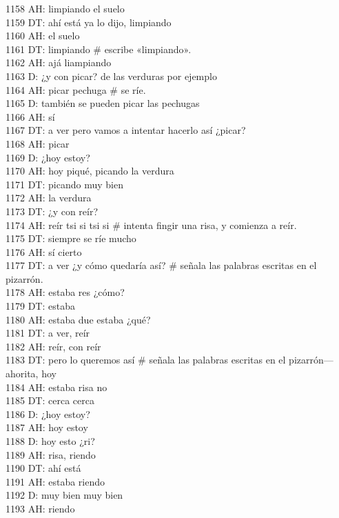1158 AH: limpiando el suelo\\
1159 DT: ahí está ya lo dijo, limpiando\\
1160 AH: el suelo\\
1161 DT: limpiando \# escribe «limpiando».\\
1162 AH: ajá liampiando\\
1163 D: ¿y con picar? de las verduras por ejemplo\\
1164 AH: picar pechuga \# se ríe.\\
1165 D: también se pueden picar las pechugas\\
1166 AH: sí\\
1167 DT: a ver pero vamos a intentar hacerlo así ¿picar?\\
1168 AH: picar\\
1169 D: ¿hoy estoy?\\
1170 AH: hoy piqué, picando la verdura\\
1171 DT: picando muy bien\\
1172 AH: la verdura\\
1173 DT: ¿y con reír?\\
1174 AH: reír tsi si tsi si \# intenta fingir una risa, y comienza a reír.\\
1175 DT: siempre se ríe mucho\\
1176 AH: sí cierto\\
1177 DT: a ver ¿y cómo quedaría así? \# señala las palabras escritas en el pizarrón.\\
1178 AH: estaba res ¿cómo?\\
1179 DT: estaba\\
1180 AH: estaba due estaba ¿qué?\\
1181 DT: a ver, reír\\
1182 AH: reír, con reír\\
1183 DT: pero lo queremos así \# señala las palabras escritas en el pizarrón--- ahorita, hoy\\
1184 AH: estaba risa no\\
1185 DT: cerca cerca\\
1186 D: ¿hoy estoy?\\
1187 AH: hoy estoy\\
1188 D: hoy esto ¿ri?\\
1189 AH: risa, riendo\\
1190 DT: ahí está\\
1191 AH: estaba riendo\\
1192 D: muy bien muy bien\\
1193 AH: riendo\\
